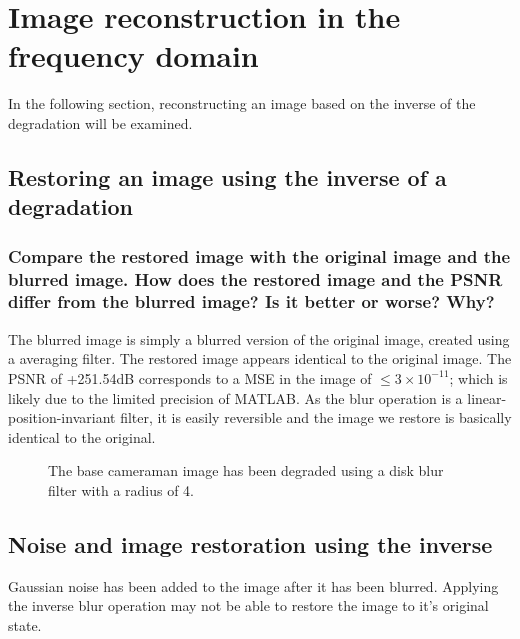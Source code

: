 \clearpage
\section{Image reconstruction in the frequency domain}

In the following section, reconstructing an image based on the inverse of the degradation will be examined.

\subsection{Restoring an image using the inverse of a degradation}

\subsubsection{Compare the restored image with the original image and the blurred image. How does the restored image and the PSNR differ from the blurred image? Is it better or worse? Why?}

The blurred image is simply a blurred version of the original image, created using a averaging filter. The restored image appears identical to the original image. The PSNR of +251.54dB corresponds to a MSE in the image of $\leq 3\times{10}^{-11}$; which is likely due to the limited precision of MATLAB. As the blur operation is a linear-position-invariant filter, it is easily reversible and the image we restore is basically identical to the original.


\begin{figure}[ht]
\centering
	\caption{The base cameraman image has been degraded using a disk blur filter with a radius of 4.}
\end{figure}

\clearpage
\subsection{Noise and image restoration using the inverse}
Gaussian noise has been added to the image after it has been blurred. Applying the inverse blur operation may not be able to restore the image to it's original state.

